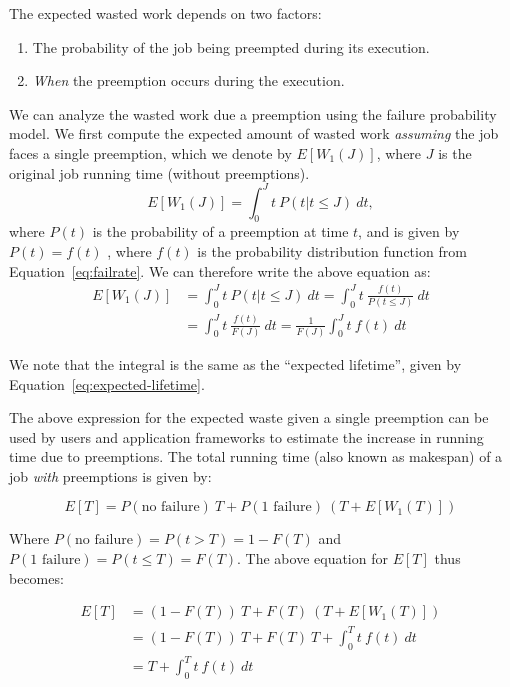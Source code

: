 The expected wasted work depends on two factors:
\begin{enumerate}
\item The probability of the job being preempted during its execution. 
\item \emph{When} the preemption occurs during the execution. 
\end{enumerate}

We can analyze the wasted work due a preemption using the failure probability model.
We first compute the expected amount of wasted work \emph{assuming} the job faces a single preemption, which we denote by $E[W_1(J)]$, where $J$ is the original job running time (without preemptions).
\begin{equation}
E[W_1(J)] = \int_0^{J} t~P(t | t \leq J)~dt , 
\end{equation}
where $P(t)$ is the probability of a preemption at time $t$, and is given by $P(t) = f(t)$ , where $f(t)$ is the probability distribution function from Equation~\ref{eq:failrate}.
We can therefore write the above equation as:
\begin{align}
  E[W_1(J)] &= \int_0^{J} t~P(t | t \leq J)~dt \nonumber 
  = \int_0^{J} t~\frac{f(t)}{P(t \leq J)}~dt \\ 
  &= \int_0^{J} t~\frac{f(t)}{F(J)}~dt 
    = \frac{1}{F(J)}  \int_0^{J} t~f(t)~dt
    \label{eq:wasted}
\end{align}

We note that the integral is the same as the ``expected lifetime'', given by Equation~\ref{eq:expected-lifetime}.

The above expression for the expected waste given a single preemption can be used by users and application frameworks to estimate the increase in running time due to preemptions. %
The total running time (also known as makespan) of a job \emph{with} preemptions is given by:

\begin{equation}
  \label{eq:tot-run-time}
  E[T] = P(\text{no failure})~T + P(\text{1 failure})~(T + E[W_1(T)])
\end{equation}

Where $P(\text{no failure}) = P(t > T) =  1- F(T)$ and $P(\text{1 failure}) = P(t \leq T) = F(T)$.
The above equation for $E[T]$ thus becomes: 

\begin{align}
  \label{eq:tot-run-time-2}
  E[T] &= (1-F(T))~T + F(T)~(T + E[W_1(T)]) \\ \nonumber
  &= (1-F(T))~T + F(T)~T + \int_0^{T} t~f(t)~dt \\ \nonumber
       &= T + \int_0^{T} t~f(t)~dt         
\end{align}


